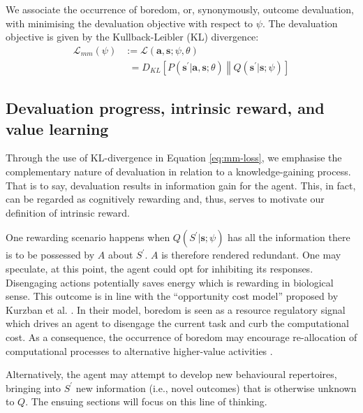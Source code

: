 \documentclass[utf8]{frontiersSCNS}
\newcommand{\bs}{\boldsymbol}
\begin{document}
We associate the occurrence of boredom, or, synonymously, outcome devaluation, with minimising the devaluation objective with respect to $\psi$. The devaluation objective is given by the Kullback-Leibler (KL) divergence:
%
	\begin{equation}
	\begin{aligned} \label{eq:mm-loss}
	\mathcal{L}_{mm}(\psi) &:=
	\mathcal{L}(\bs{a}, \bs{s}; \psi, \theta) \\
		&\phantom{:}= 
		D_{KL}\left[ P(\bs{s}^\prime|\bs{a}, \bs{s}; \theta) 
		\middle\Vert 
		Q(\bs{s}^\prime|\bs{s}; \psi) \right]
	\end{aligned}
	\end{equation}
%

\subsection{Devaluation progress, intrinsic reward, and value learning}

Through the use of KL-divergence in Equation \ref{eq:mm-loss}, we emphasise the complementary nature of devaluation in relation to a knowledge-gaining process. That is to say, devaluation results in information gain for the agent. This, in fact, can be regarded as cognitively rewarding and, thus, serves to motivate our definition of intrinsic reward. 

One rewarding scenario happens when $Q(S^\prime|\bs{s}; \psi)$ has all the information there is to be possessed by $A$ about $S^\prime$. $A$ is therefore rendered redundant. One may speculate, at this point, the agent could opt for inhibiting its responses. Disengaging actions potentially saves energy which is rewarding in biological sense. \label{rev:energyPOV} This outcome is in line with the ``opportunity cost model'' proposed by Kurzban et al. \citeyearpar{Kurzban2013}. In their model, boredom is seen as a resource regulatory signal which drives an agent to disengage the current task and curb the computational cost. As a consequence, the occurrence of boredom may encourage re-allocation of computational processes to alternative higher-value activities \citep{Kurzban2013}.

Alternatively, the agent may attempt to develop new behavioural repertoires, bringing into $S^\prime$ new information (i.e., novel outcomes) that is otherwise unknown to $Q$. The ensuing sections will focus on this line of thinking.
\end{document}

